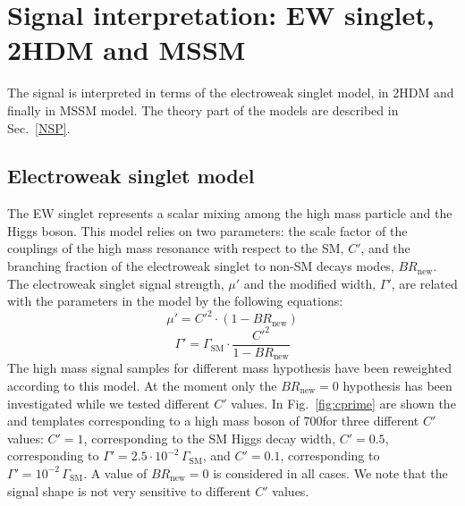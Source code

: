 

\section{Signal interpretation: EW singlet, 2HDM and MSSM}
\label{sec:signalModel}
The signal is interpreted in terms of the electroweak singlet model, in 2HDM and finally in  MSSM model. The theory part of the models are described in Sec.~\ref{NSP}. 

\subsection*{Electroweak singlet model}
The EW singlet represents a scalar mixing among the high mass particle and the Higgs boson. This model relies on two parameters: the scale factor of the couplings of the high mass resonance with respect to the SM, $C'$, and the branching fraction of the electroweak singlet to non-SM decays modes, $BR_\mathrm{new}$. The electroweak singlet signal strength, $\mu'$ and the modified width, $\Gamma'$, are related with the parameters in the model by the following equations:
\begin{equation}
\mu' = C'^2 \cdot (1 - BR_\mathrm{new})
\end{equation}
\begin{equation}
\Gamma' = \Gamma_\mathrm{SM} \cdot \frac{C'^2}{1 - BR_\mathrm{new}}
\end{equation}
The high mass signal samples for different mass hypothesis have been reweighted according to this model. At the moment only the $BR_\mathrm{new} = 0$ hypothesis has been investigated while we tested different $C'$ values.
In Fig.~\ref{fig:cprime} are shown the \mll and \mt templates corresponding to a high mass boson  of 700\GeV for three different $C'$ values: $C' = 1$, corresponding to the SM Higgs decay width, $C'=0.5$, corresponding to $\Gamma' = 2.5\cdot10^{-2}\,\Gamma_\mathrm{SM}$, and $C'=0.1$, corresponding to $\Gamma' = 10^{-2}\,\Gamma_\mathrm{SM}$. A value of $BR_\mathrm{new} = 0$ is considered in all cases. We note that the signal shape is not very sensitive to different $C'$ values.

